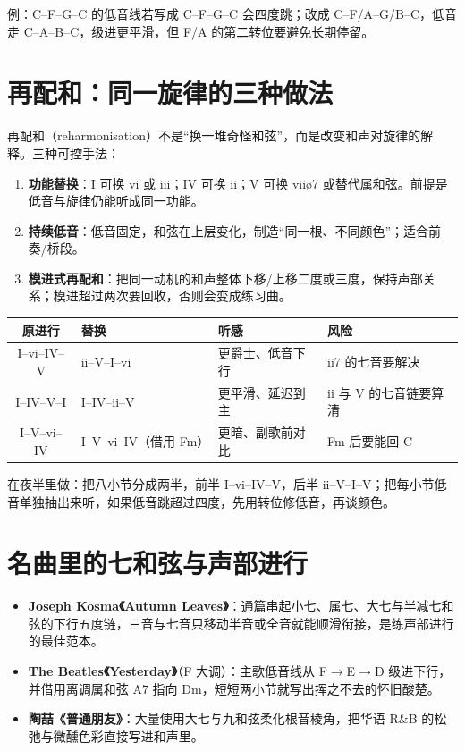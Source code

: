 例：C--F--G--C 的低音线若写成 C--F--G--C 会四度跳；改成 C--F/A--G/B--C，低音走 C--A--B--C，级进更平滑，但 F/A 的第二转位要避免长期停留。

\section{再配和：同一旋律的三种做法}

再配和（reharmonisation）不是“换一堆奇怪和弦”，而是改变和声对旋律的解释。三种可控手法：

\begin{enumerate}
  \item \textbf{功能替换}：I 可换 vi 或 iii；IV 可换 ii；V 可换 viiø7 或替代属和弦。前提是低音与旋律仍能听成同一功能。
  \item \textbf{持续低音}：低音固定，和弦在上层变化，制造“同一根、不同颜色”；适合前奏/桥段。
  \item \textbf{模进式再配和}：把同一动机的和声整体下移/上移二度或三度，保持声部关系；模进超过两次要回收，否则会变成练习曲。
\end{enumerate}

\begin{center}
\small
\begin{tabular}{clll}
\toprule
原进行 & 替换 & 听感 & 风险 \\
\midrule
I--vi--IV--V & ii--V--I--vi & 更爵士、低音下行 & ii7 的七音要解决 \\
I--IV--V--I & I--IV--ii--V & 更平滑、延迟到主 & ii 与 V 的七音链要算清 \\
I--V--vi--IV & I--V--vi--IV（借用 Fm） & 更暗、副歌前对比 & Fm 后要能回 C \\
\bottomrule
\end{tabular}
\end{center}

在夜半里做：把八小节分成两半，前半 I--vi--IV--V，后半 ii--V--I--V；把每小节低音单独抽出来听，如果低音跳超过四度，先用转位修低音，再谈颜色。

\section{名曲里的七和弦与声部进行}

\begin{itemize}
  \item \textbf{Joseph Kosma《Autumn Leaves》}：通篇串起小七、属七、大七与半减七和弦的下行五度链，三音与七音只移动半音或全音就能顺滑衔接，是练声部进行的最佳范本。
  \item \textbf{The Beatles《Yesterday》}（F 大调）：主歌低音线从 F$\rightarrow$E$\rightarrow$D 级进下行，并借用离调属和弦 A7 指向 Dm，短短两小节就写出挥之不去的怀旧酸楚。
  \item \textbf{陶喆《普通朋友》}：大量使用大七与九和弦柔化根音棱角，把华语 R\&B 的松弛与微醺色彩直接写进和声里。
\end{itemize}

